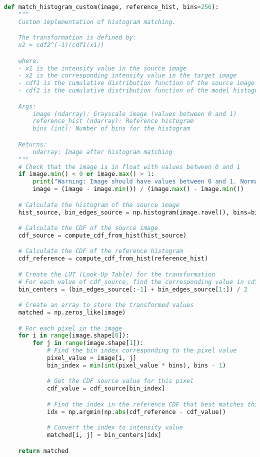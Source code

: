 \documentclass[12pt,a4paper]{article}
\begin{document}
\begin{lstlisting}[language=Python, caption=Histogram matching implementation]
def match_histogram_custom(image, reference_hist, bins=256):
    """
    Custom implementation of histogram matching.

    The transformation is defined by:
    x2 = cdf2^(-1)(cdf1(x1))

    where:
    - x1 is the intensity value in the source image
    - x2 is the corresponding intensity value in the target image
    - cdf1 is the cumulative distribution function of the source image
    - cdf2 is the cumulative distribution function of the model histogram

    Args:
        image (ndarray): Grayscale image (values between 0 and 1)
        reference_hist (ndarray): Reference histogram
        bins (int): Number of bins for the histogram

    Returns:
        ndarray: Image after histogram matching
    """
    # Check that the image is in float with values between 0 and 1
    if image.min() < 0 or image.max() > 1:
        print("Warning: Image should have values between 0 and 1. Normalization applied.")
        image = (image - image.min()) / (image.max() - image.min())

    # Calculate the histogram of the source image
    hist_source, bin_edges_source = np.histogram(image.ravel(), bins=bins, range=(0, 1))

    # Calculate the CDF of the source image
    cdf_source = compute_cdf_from_hist(hist_source)

    # Calculate the CDF of the reference histogram
    cdf_reference = compute_cdf_from_hist(reference_hist)

    # Create the LUT (Look-Up Table) for the transformation
    # For each value of cdf_source, find the corresponding value in cdf_reference
    bin_centers = (bin_edges_source[:-1] + bin_edges_source[1:]) / 2

    # Create an array to store the transformed values
    matched = np.zeros_like(image)

    # For each pixel in the image
    for i in range(image.shape[0]):
        for j in range(image.shape[1]):
            # Find the bin index corresponding to the pixel value
            pixel_value = image[i, j]
            bin_index = min(int(pixel_value * bins), bins - 1)

            # Get the CDF source value for this pixel
            cdf_value = cdf_source[bin_index]

            # Find the index in the reference CDF that best matches this value
            idx = np.argmin(np.abs(cdf_reference - cdf_value))

            # Convert the index to intensity value
            matched[i, j] = bin_centers[idx]

    return matched
\end{lstlisting}
\end{document}
